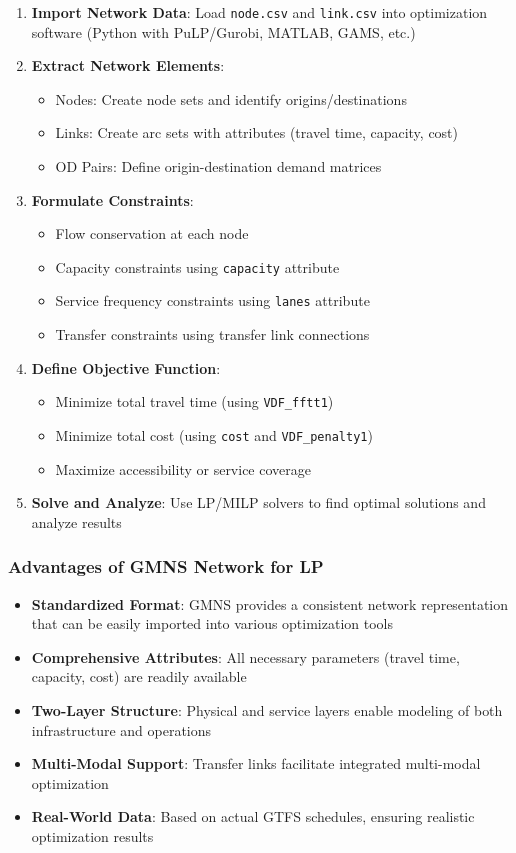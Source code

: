 \documentclass[11pt,a4paper]{article}
\begin{document}
\begin{enumerate}
    \item \textbf{Import Network Data}: Load \texttt{node.csv} and \texttt{link.csv} into optimization software (Python with PuLP/Gurobi, MATLAB, GAMS, etc.)
    \item \textbf{Extract Network Elements}: 
    \begin{itemize}
        \item Nodes: Create node sets and identify origins/destinations
        \item Links: Create arc sets with attributes (travel time, capacity, cost)
        \item OD Pairs: Define origin-destination demand matrices
    \end{itemize}
    \item \textbf{Formulate Constraints}:
    \begin{itemize}
        \item Flow conservation at each node
        \item Capacity constraints using \texttt{capacity} attribute
        \item Service frequency constraints using \texttt{lanes} attribute
        \item Transfer constraints using transfer link connections
    \end{itemize}
    \item \textbf{Define Objective Function}:
    \begin{itemize}
        \item Minimize total travel time (using \texttt{VDF\_fftt1})
        \item Minimize total cost (using \texttt{cost} and \texttt{VDF\_penalty1})
        \item Maximize accessibility or service coverage
    \end{itemize}
    \item \textbf{Solve and Analyze}: Use LP/MILP solvers to find optimal solutions and analyze results
\end{enumerate}

\subsubsection{Advantages of GMNS Network for LP}

\begin{itemize}
    \item \textbf{Standardized Format}: GMNS provides a consistent network representation that can be easily imported into various optimization tools
    \item \textbf{Comprehensive Attributes}: All necessary parameters (travel time, capacity, cost) are readily available
    \item \textbf{Two-Layer Structure}: Physical and service layers enable modeling of both infrastructure and operations
    \item \textbf{Multi-Modal Support}: Transfer links facilitate integrated multi-modal optimization
    \item \textbf{Real-World Data}: Based on actual GTFS schedules, ensuring realistic optimization results
\end{itemize}
\end{document}
